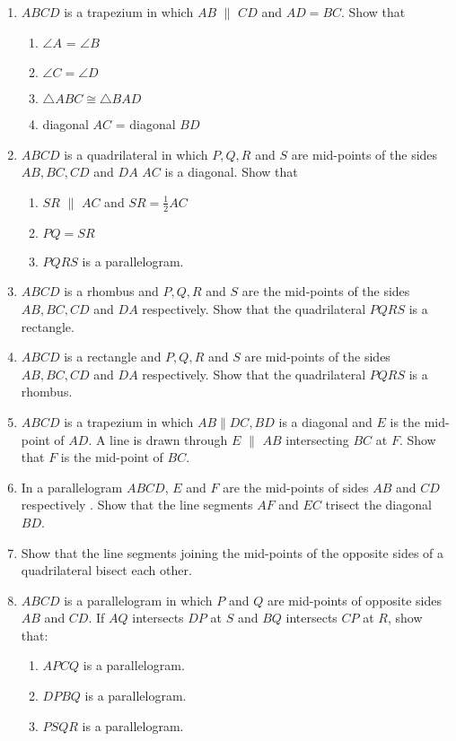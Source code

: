 \begin{enumerate}[label=\thesection.\arabic*.,ref=\thesection.\theenumi]
\item $ABCD$ is a trapezium in which $AB$  $\parallel$  $CD$ and $AD = BC$. Show that 
\begin{enumerate} 
\item$\angle A$ =  $\angle B$  
\item  $\angle C  =  \angle D$  \item  $\triangle  ABC  \cong   \triangle  BAD$ 
\item diagonal $AC$ = diagonal $BD$ 
\end{enumerate}
%
\item $ABCD$ is a quadrilateral in which $P, Q, R$ and $S$ are mid-points of the sides $AB, BC, CD$ and $DA$ $AC$ is a diagonal. Show that 
\begin{enumerate} 
\item $SR$  $\parallel$  $AC$ and $SR =\frac{1}{ 2}AC$
\item $PQ = SR$ 
\item  $PQRS$  is a parallelogram.
\end{enumerate}
%
\item $ABCD$ is a rhombus and  $P, Q, R$ and $S$  are the mid-points of the sides  $AB, BC, CD$ and $DA$ respectively. Show that the quadrilateral  $PQRS$  is a rectangle.
\item $ABCD$ is a rectangle and  $P, Q, R$ and $S$  are mid-points of the sides  $AB, BC, CD$ and $DA$ respectively. Show that the quadrilateral  $PQRS$  is a rhombus.
\item $ABCD$ is a trapezium in which $AB  \parallel  DC, BD$ is a diagonal and $E$ is the mid-point of $AD$. A line is drawn through $E$ $\parallel$  $AB$ intersecting $BC$ at $F$. Show that $F$ is the mid-point of $BC$.
\item In a parallelogram $ABCD$, $E$ and $F$ are the mid-points of sides $AB$ and $CD$ respectively . Show that the line segments $AF$ and $EC$ trisect the diagonal $BD$.
\item Show that the line segments joining the mid-points of the opposite sides of a quadrilateral bisect each other.
\item $ABCD$ is a parallelogram in which $P$ and $Q$ are mid-points of opposite sides $AB$ and $CD$. If $AQ$ intersects $DP$ at $S$ and $BQ$ intersects $CP$ at $R$, show that: 
%
\begin{enumerate}
\item  $APCQ$ is a parallelogram. 
\item $DPBQ$ is a parallelogram. 
\item $PSQR$ is a parallelogram.

\end{enumerate}
\end{enumerate}
